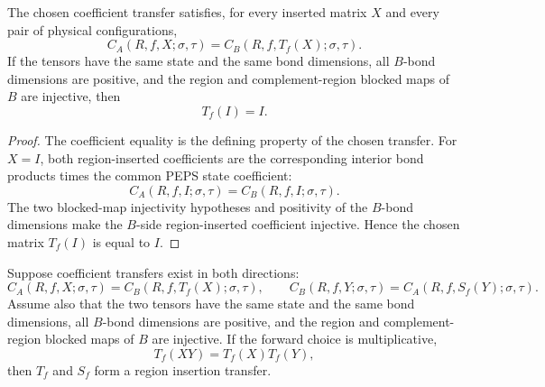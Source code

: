 \begin{theorem}
    \label{thm:peps_coeff_transfer_map_properties}
    \leanok
    The chosen coefficient transfer satisfies, for every inserted matrix $X$ and
    every pair of physical configurations,
    \[
        C_A(R,f,X;\sigma,\tau)
        =
        C_B(R,f,T_f(X);\sigma,\tau).
    \]
    If the tensors have the same state and the same bond dimensions, all
    $B$-bond dimensions are positive, and the region and complement-region
    blocked maps of $B$ are injective, then
    \[
        T_f(I)=I.
    \]
\end{theorem}
\begin{proof}\leanok
    The coefficient equality is the defining property of the chosen transfer.
    For $X=I$, both region-inserted coefficients are the corresponding interior
    bond products times the common PEPS state coefficient:
    \[
        C_A(R,f,I;\sigma,\tau)
        =
        C_B(R,f,I;\sigma,\tau).
    \]
    The two blocked-map injectivity hypotheses and positivity of the $B$-bond
    dimensions make the $B$-side region-inserted coefficient injective.  Hence
    the chosen matrix $T_f(I)$ is equal to $I$.
\end{proof}

\begin{definition}
    \label{def:peps_region_insertion_transfer_of_coeff_transfer}
    \leanok
    Suppose coefficient transfers exist in both directions:
    \[
        C_A(R,f,X;\sigma,\tau)
        =
        C_B(R,f,T_f(X);\sigma,\tau),
        \qquad
        C_B(R,f,Y;\sigma,\tau)
        =
        C_A(R,f,S_f(Y);\sigma,\tau).
    \]
    Assume also that the two tensors have the same state and the same bond
    dimensions, all $B$-bond dimensions are positive, and the region and
    complement-region blocked maps of $B$ are injective.  If the forward choice
    is multiplicative,
    \[
        T_f(XY)=T_f(X)T_f(Y),
    \]
    then $T_f$ and $S_f$ form a region insertion transfer.
\end{definition}

